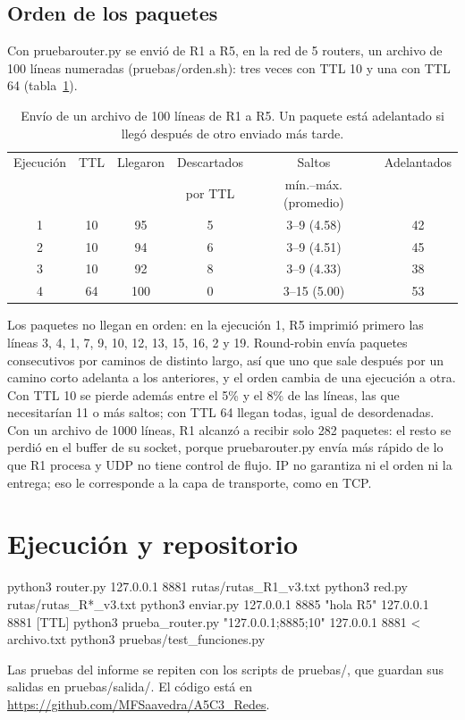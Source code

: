 \documentclass[
	spanish, %
	letterpaper, oneside
]{article}
\newcommand{\codeunderscore}{\textunderscore\allowbreak}
\newcommand{\code}[1]{{\let\_\codeunderscore#1}}     %
\begin{document}
\subsection{Orden de los paquetes}
\label{sec:orden}
Con \code{prueba\_router.py} se envió de R1 a R5, en la red de 5 routers, un archivo de 100 líneas numeradas (\code{pruebas/orden.sh}): tres veces con TTL 10 y una con TTL 64 (tabla~\ref{tab:orden}).

\begin{table}[ht]
	\centering
	\caption[Envío de un archivo de 100 líneas de R1 a R5.]{Envío de un archivo de 100 líneas de R1 a R5. Un paquete está adelantado si llegó después de otro enviado más tarde.}
	\begin{tabular}{cccccc}
		\hline
		Ejecución & TTL & Llegaron & Descartados & Saltos & Adelantados \\
		& & & por TTL & mín.--máx. (promedio) & \\
		\hline
		1 & 10 & 95 & 5 & 3--9 (4.58) & 42 \\
		2 & 10 & 94 & 6 & 3--9 (4.51) & 45 \\
		3 & 10 & 92 & 8 & 3--9 (4.33) & 38 \\
		4 & 64 & 100 & 0 & 3--15 (5.00) & 53 \\
		\hline
	\end{tabular}
	\label{tab:orden}
\end{table}

Los paquetes no llegan en orden: en la ejecución 1, R5 imprimió primero las líneas 3, 4, 1, 7, 9, 10, 12, 13, 15, 16, 2 y 19. Round-robin envía paquetes consecutivos por caminos de distinto largo, así que uno que sale después por un camino corto adelanta a los anteriores, y el orden cambia de una ejecución a otra. Con TTL 10 se pierde además entre el 5\% y el 8\% de las líneas, las que necesitarían 11 o más saltos; con TTL 64 llegan todas, igual de desordenadas. Con un archivo de 1000 líneas, R1 alcanzó a recibir solo 282 paquetes: el resto se perdió en el buffer de su socket, porque \code{prueba\_router.py} envía más rápido de lo que R1 procesa y UDP no tiene control de flujo. IP no garantiza ni el orden ni la entrega; eso le corresponde a la capa de transporte, como en TCP.

\section{Ejecución y repositorio}
\begin{salida}
python3 router.py 127.0.0.1 8881 rutas/rutas_R1_v3.txt
python3 red.py rutas/rutas_R*_v3.txt
python3 enviar.py 127.0.0.1 8885 "hola R5" 127.0.0.1 8881 [TTL]
python3 prueba_router.py "127.0.0.1;8885;10" 127.0.0.1 8881 < archivo.txt
python3 pruebas/test_funciones.py
\end{salida}
Las pruebas del informe se repiten con los scripts de \code{pruebas/}, que guardan sus salidas en \code{pruebas/salida/}. El código está en \url{https://github.com/MFSaavedra/A5C3_Redes}.
\end{document}
